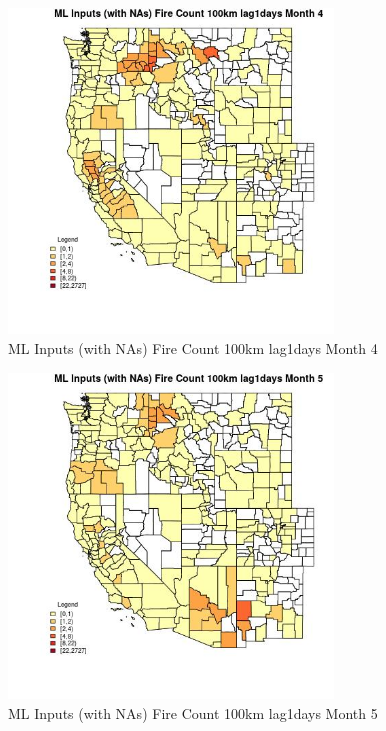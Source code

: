 \begin{figure} 
\centering  
\includegraphics[width=0.77\textwidth]{Code_Outputs/Report_ML_input_PM25_Step4_part_f_de_duplicated_aves_prioritize_24hr_obswNAs_CountyFire_Count_100km_lag1daysmedianMonth4.jpg} 
\caption{\label{fig:Report_ML_input_PM25_Step4_part_f_de_duplicated_aves_prioritize_24hr_obswNAsCountyFire_Count_100km_lag1daysmedianMonth4}ML Inputs (with NAs) Fire Count 100km lag1days Month 4} 
\end{figure} 
 

\begin{figure} 
\centering  
\includegraphics[width=0.77\textwidth]{Code_Outputs/Report_ML_input_PM25_Step4_part_f_de_duplicated_aves_prioritize_24hr_obswNAs_CountyFire_Count_100km_lag1daysmedianMonth5.jpg} 
\caption{\label{fig:Report_ML_input_PM25_Step4_part_f_de_duplicated_aves_prioritize_24hr_obswNAsCountyFire_Count_100km_lag1daysmedianMonth5}ML Inputs (with NAs) Fire Count 100km lag1days Month 5} 
\end{figure} 
 

